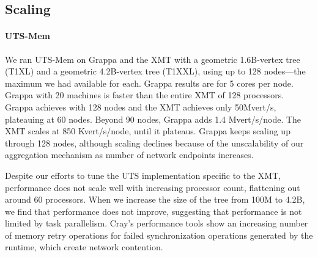 
\subsection{Scaling}
\paragraph{UTS-Mem}
We ran UTS-Mem on Grappa and the XMT with a geometric 1.6B-vertex tree
(T1XL) and a geometric 4.2B-vertex tree (T1XXL), using up to 128
nodes---the maximum we had available for each. Grappa results are for 5 cores per node. Grappa with 20 machines is faster than the entire XMT of 128 processors.
Grappa achieves  with 128 nodes and the XMT
achieves only 50Mvert/s, plateauing at 60 nodes. Beyond 90 nodes, Grappa adds 1.4 Mvert/s/node.
The XMT scales at 850 Kvert/s/node, until it plateaus. Grappa keeps
scaling up through 128 nodes, although scaling
declines because of the unscalability of our aggregation mechanism as
number of network endpoints increases. 

Despite our efforts to tune the UTS implementation specific to the 
XMT, performance does not scale well with increasing processor count,
flattening out around 60 processors.  When we increase the size of
the tree from 100M to 4.2B, we find that performance does not improve,
suggesting that performance is not limited by task parallelism.
Cray's performance tools show an increasing number of memory
retry operations for failed synchronization operations generated by
the runtime, which create network contention.


